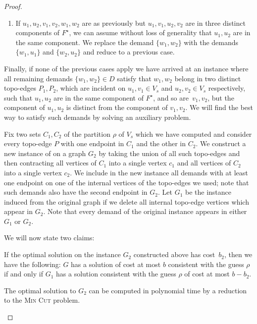 \begin{proof}
\begin{enumerate}
\item If $u_1,u_2,v_1,v_2,w_1,w_2$ are as previously but $u_1,v_1,u_2,v_2$ are
in three distinct components of $F^\star$, we can assume without loss of
generality that $u_1,u_2$ are in the same component. We replace the demand
$\{w_1,w_2\}$ with the demands $\{w_1,u_1\}$ and $\{w_2,u_2\}$ and reduce to a
previous case.

\end{enumerate}

Finally, if none of the previous cases apply we have arrived at an instance
where all remaining demands $\{w_1,w_2\}\in D$ satisfy that $w_1,w_2$
belong in two distinct topo-edges $P_1,P_2$, which are incident on $u_1,v_1\in
V_s$ and $u_2,v_2\in V_s$ respectively, such that $u_1,u_2$ are in the same
component of $F^\star$, and so are~$v_1,v_2$, but the component of $u_1,u_2$ is
distinct from the component of $v_1,v_2$.  We will find the best way to satisfy
such demands by solving an auxiliary problem.

Fix two sets $C_1,C_2$ of the partition $\rho$ of $V_s$ which we have computed
and consider every topo-edge $P$ with one endpoint in $C_1$ and the other in
$C_2$. We construct a new instance of \SF on a graph $G_2$ by taking the union
of all such topo-edges and then contracting all vertices of $C_1$ into a single
vertex $c_1$ and all vertices of $C_2$ into a single vertex $c_2$. We include
in the new instance all demands with at least one endpoint on one of the
internal vertices of the topo-edges we used; note that such demands also have
the second endpoint in $G_2$. Let $G_1$ be the instance induced from the
original graph if we delete all internal topo-edge vertices which appear in
$G_2$. Note that every demand of the original instance appears in either $G_1$
or $G_2$.

We will now state two claims:

\begin{claim}\label{claim:g1g2} %
If the optimal \SF solution on the
instance $G_2$ constructed above has cost~$b_2$, then we have the following:
$G$ has a solution of cost at most $b$ consistent with the guess $\rho$ if and
only if $G_1$ has a solution consistent with the guess $\rho$ of cost at most
$b-b_2$.  \end{claim}

\begin{claim}\label{claim:g2opt} %
The optimal solution to $G_2$ can be
computed in polynomial time by a reduction to the \textsc{Min Cut} problem.
\end{claim}


\end{proof}
